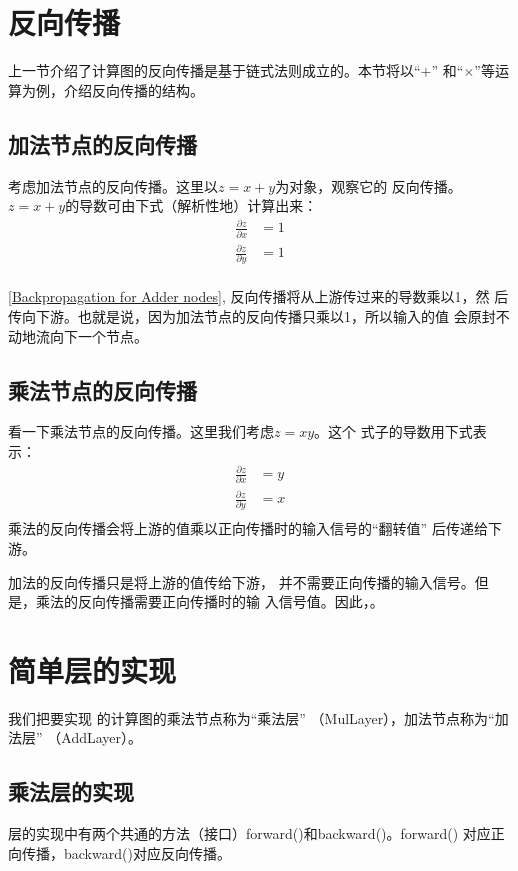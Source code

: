 \section{反向传播}
上一节介绍了计算图的反向传播是基于链式法则成立的。本节将以“$+$”
和“$\times$”等运算为例，介绍反向传播的结构。
\subsection{加法节点的反向传播}
考虑加法节点的反向传播。这里以$z = x + y$为对象，观察它的
反向传播。$z = x + y$的导数可由下式（解析性地）计算出来：
\begin{equation*}
    \begin{aligned}
        \frac{\partial z}{\partial x} & =1 \\
        \frac{\partial z}{\partial y} & =1 \\
    \end{aligned}
\end{equation*}

\autoref{Backpropagation for Adder nodes}, 反向传播将从上游传过来的导数乘以1，然
后传向下游。也就是说，因为加法节点的反向传播只乘以1，所以输入的值
会原封不动地流向下一个节点。


\subsection{乘法节点的反向传播}
看一下乘法节点的反向传播。这里我们考虑$z = xy$。这个
式子的导数用下式表示：
\begin{equation*}
    \begin{aligned}
        \frac{\partial z}{\partial x} & =y \\
        \frac{\partial z}{\partial y} & =x \\
    \end{aligned}
\end{equation*}
乘法的反向传播会将上游的值乘以正向传播时的输入信号的“翻转值”
后传递给下游。

加法的反向传播只是将上游的值传给下游，
并不需要正向传播的输入信号。但是，乘法的反向传播需要正向传播时的输
入信号值。因此，。


\section{简单层的实现}
我们把要实现
的计算图的乘法节点称为“乘法层”
（MulLayer），加法节点称为“加法层”
（AddLayer）。
\subsection{乘法层的实现}
层的实现中有两个共通的方法（接口）forward()和backward()。forward()
对应正向传播，backward()对应反向传播。